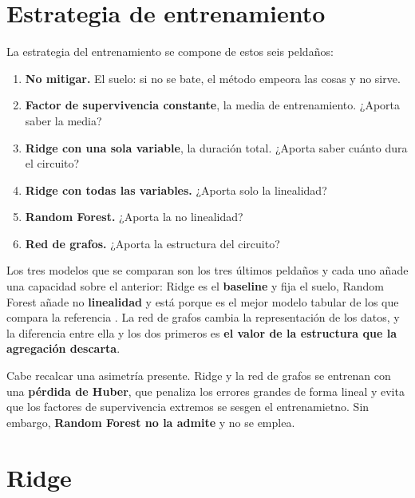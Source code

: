 \section{Estrategia de entrenamiento}
\label{sec:entrenamiento}

La estrategia del entrenamiento se compone de estos seis peldaños:

\begin{enumerate}
    \item \textbf{No mitigar.} El suelo: si no se bate, el método empeora las cosas y no sirve.
    \item \textbf{Factor de supervivencia constante}, la media de entrenamiento. ¿Aporta saber la media?
    \item \textbf{Ridge con una sola variable}, la duración total. ¿Aporta saber cuánto dura
          el circuito?
    \item \textbf{Ridge con todas las variables.} ¿Aporta solo la linealidad?
    \item \textbf{Random Forest.} ¿Aporta la no linealidad?
    \item \textbf{Red de grafos.} ¿Aporta la estructura del circuito?
\end{enumerate}

Los tres modelos que se comparan son los tres últimos peldaños y cada uno añade una capacidad sobre el anterior: Ridge es el
\textbf{baseline} y fija el suelo, Random Forest añade no \textbf{linealidad} y está porque es el mejor modelo tabular de los que compara la referencia \cite{liao2024machine}. La red de grafos cambia la representación de los datos, y la diferencia entre ella y los dos primeros es \textbf{el valor de la
estructura que la agregación descarta}.

Cabe recalcar una asimetría presente. Ridge y la red de
grafos se entrenan con una \textbf{pérdida de Huber}, que penaliza los errores grandes de forma lineal y evita que los factores de supervivencia extremos se sesgen el entrenamietno. Sin embargo, \textbf{Random Forest no la admite} y no se emplea.


\section{Ridge}
\label{sec:sol_ridge}

